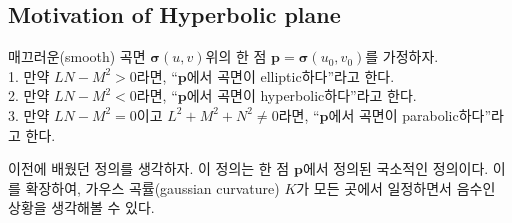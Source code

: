 \documentclass[10pt,a4paper]{article}
\begin{document}
\subsection{Motivation of Hyperbolic plane}

\begin{tcolorbox}[title = Elliptic{,} Hyperbolic{,} Parabolic]
매끄러운(smooth) 곡면 $\boldsymbol{\sigma}(u,v)$위의 한 점 $\mathbf{p} = \boldsymbol{\sigma}(u_{0}, v_{0})$를 가정하자.\\
1. 만약 $LN - M^{2} > 0$라면, ``$\mathbf{p}$에서 곡면이 elliptic하다''라고 한다.\\
2. 만약 $LN - M^{2} < 0$라면, ``$\mathbf{p}$에서 곡면이 hyperbolic하다''라고 한다.\\
3. 만약 $LN - M^{2} = 0$이고 $L^{2}+M^{2}+N^{2} \neq 0$라면, ``$\mathbf{p}$에서 곡면이 parabolic하다''라고 한다.
\end{tcolorbox}
이전에 배웠던 정의를 생각하자. 이 정의는 한 점 $\mathbf{p}$에서 정의된 국소적인 정의이다. 이를 확장하여, 가우스 곡률(gaussian curvature) $K$가 모든 곳에서 일정하면서 음수인 상황을 생각해볼 수 있다.
\end{document}
